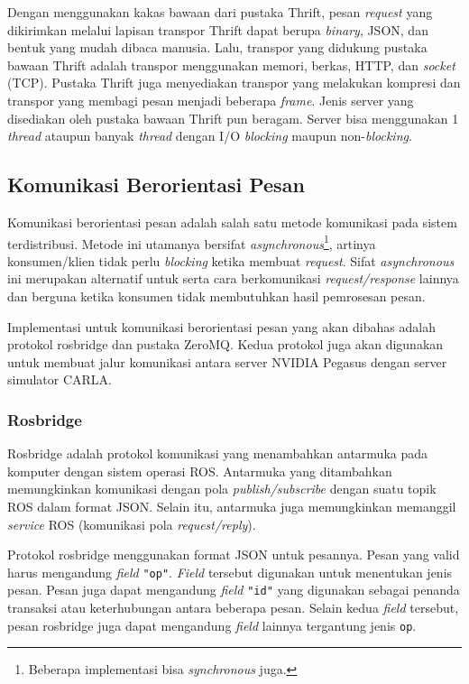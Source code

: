 Dengan menggunakan kakas bawaan dari pustaka Thrift, pesan \textit{request} yang
di\-ki\-rim\-kan melalui lapisan transpor Thrift dapat berupa \textit{binary},
JSON, dan bentuk yang mudah dibaca manusia. Lalu, transpor yang didukung pustaka
bawaan Thrift adalah transpor menggunakan memori, berkas, HTTP, dan
\textit{socket} (TCP). Pustaka Thrift juga menyediakan transpor yang melakukan
kompresi dan transpor yang membagi pesan menjadi beberapa \textit{frame}. Jenis
server yang disediakan oleh pustaka bawaan Thrift pun beragam. Server bisa
menggunakan 1 \textit{thread} ataupun banyak \textit{thread} dengan I/O
\textit{blocking} maupun non-\textit{blocking}.

\subsection{Komunikasi Berorientasi Pesan}

Komunikasi berorientasi pesan adalah salah satu metode komunikasi pada sistem
terdistribusi. Metode ini utamanya bersifat
\textit{asynchronous}\footnote{Beberapa implementasi bisa \textit{synchronous}
    juga.}, artinya konsumen/klien tidak perlu \textit{blocking} ketika membuat
\textit{request}. Sifat \textit{asynchronous} ini merupakan alternatif untuk
serta cara berkomunikasi \textit{request/response} lainnya dan berguna ketika
konsumen tidak membutuhkan hasil pemrosesan pesan.

Implementasi untuk komunikasi berorientasi pesan yang akan dibahas adalah
protokol rosbridge dan pustaka ZeroMQ. Kedua protokol juga akan digunakan untuk
membuat jalur komunikasi antara server NVIDIA Pegasus dengan server simulator
CARLA.

\subsubsection{Rosbridge}

Rosbridge adalah protokol komunikasi yang menambahkan antarmuka pada komputer
dengan sistem operasi ROS. Antarmuka yang ditambahkan memungkinkan komunikasi
dengan pola \textit{publish/subscribe} dengan suatu topik ROS dalam format JSON.
Selain itu, antarmuka juga memungkinkan memanggil \textit{service} ROS
(komunikasi pola \textit{request/reply}).

Protokol rosbridge menggunakan format JSON untuk pesannya. Pesan yang valid
harus mengandung \textit{field} \texttt{"op"}. \textit{Field} tersebut digunakan
untuk menentukan jenis pesan. Pesan juga dapat mengandung \textit{field}
\texttt{"id"} yang digunakan sebagai penanda transaksi atau keterhubungan antara
beberapa pesan. Selain kedua \textit{field} tersebut, pesan rosbridge juga dapat
mengandung \textit{field} lainnya tergantung jenis \texttt{op}.

